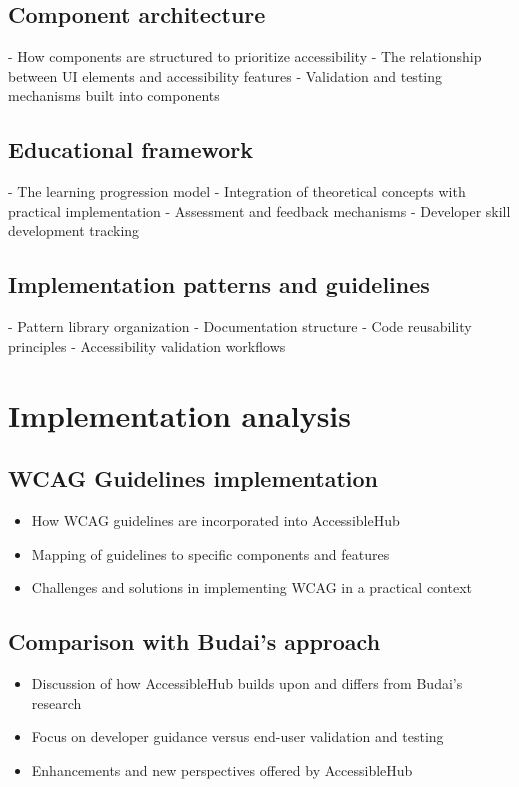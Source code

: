 \subsection{Component architecture}
- How components are structured to prioritize accessibility
- The relationship between UI elements and accessibility features
- Validation and testing mechanisms built into components

\subsection{Educational framework}
- The learning progression model
- Integration of theoretical concepts with practical implementation
- Assessment and feedback mechanisms
- Developer skill development tracking

\subsection{Implementation patterns and guidelines}
- Pattern library organization
- Documentation structure
- Code reusability principles
- Accessibility validation workflows

\section{Implementation analysis}

\subsection{WCAG Guidelines implementation}

\begin{itemize}
\item How WCAG guidelines are incorporated into AccessibleHub
\item Mapping of guidelines to specific components and features
\item Challenges and solutions in implementing WCAG in a practical context
\end{itemize}

\subsection{Comparison with Budai's approach}

\begin{itemize}
\item Discussion of how AccessibleHub builds upon and differs from Budai's research
\item Focus on developer guidance versus end-user validation and testing
\item Enhancements and new perspectives offered by AccessibleHub
\end{itemize}

